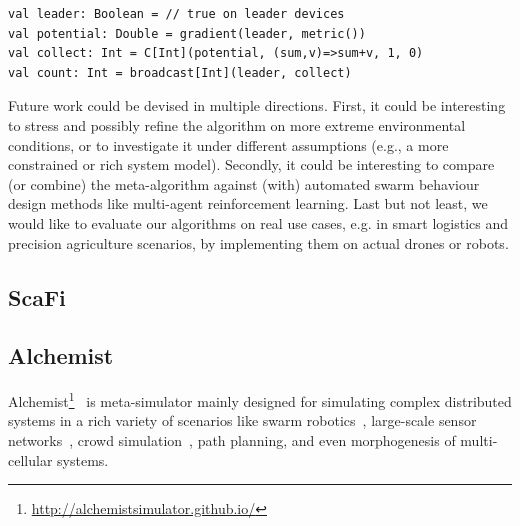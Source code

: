 \begin{lstlisting}
val leader: Boolean = // true on leader devices
val potential: Double = gradient(leader, metric())
val collect: Int = C[Int](potential, (sum,v)=>sum+v, 1, 0)
val count: Int = broadcast[Int](leader, collect)
\end{lstlisting}

Future work could be devised in multiple directions.
%
First, it could be interesting to stress and possibly refine
the algorithm on more extreme environmental conditions,
 or to investigate it under different assumptions (e.g., a more constrained or rich system model).
%
Secondly, it could be interesting to compare (or combine) the meta-algorithm against (with)
 automated swarm behaviour design methods
 like multi-agent reinforcement learning.
%
Last but not least, we would like to evaluate our algorithms on real use cases, e.g. in smart logistics and precision agriculture scenarios, by implementing them %
on actual drones or robots.
\subsection{ScaFi}\label{sec:scafi}


\subsection{Alchemist}\label{coordination2023:alchemist}

Alchemist\footnote{\url{http://alchemistsimulator.github.io/}}~\cite{DBLP:journals/jos/PianiniMV13} is meta-simulator
 mainly designed for simulating complex distributed systems 
 in a rich variety of scenarios like swarm robotics~\cite{Casadei2021},
 large-scale sensor networks~\cite{Aguzzi_2022}, crowd simulation~\cite{Beal2015},
 path planning, and even morphogenesis of multi-cellular systems.

